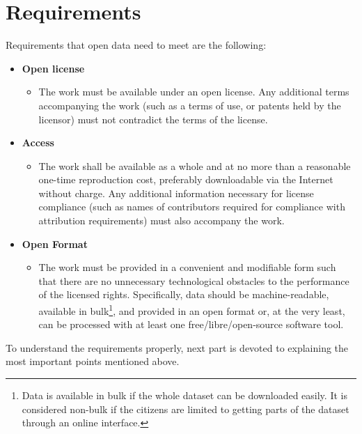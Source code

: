 \documentclass[thesis=B,english]{FITthesis}[2012/06/26]
\begin{document}
	\section{Requirements}
	Requirements that open data need to meet are the following:\cite{opendefinition}
	\renewcommand\labelitemii{}
	\begin{itemize}
	 	\item \textbf{Open license}
			\begin{itemize}
				\item The work must be available under an open license. Any additional terms accompanying the work (such as a terms of use, or patents held by the licensor) must not contradict the terms of the license.
		\end{itemize}
  		\item \textbf{Access}
  			\begin{itemize}
  				\item The work shall be available as a whole and at no more than a reasonable one-time reproduction cost, preferably downloadable via the Internet without charge. Any additional information necessary for license compliance (such as names of contributors required for compliance with attribution requirements) must also accompany the work.
  			\end{itemize}
  			\item \textbf{Open Format}
  			\begin{itemize}
  				\item The work must be provided in a convenient and modifiable form such that there are no unnecessary technological obstacles to the performance of the licensed rights. Specifically, data should be machine-readable, available in bulk\footnote{Data is available in bulk if the whole dataset can be downloaded easily. It is considered non-bulk if the citizens are limited to getting parts of the dataset through an online interface.}, and provided in an open format or, at the very least, can be processed with at least one free/libre/open-source software tool.
  			\end{itemize}
	\end{itemize}

To understand the requirements properly, next part is devoted to explaining the most important points mentioned above.
\end{document}
